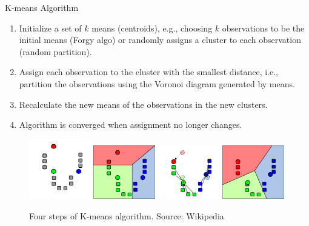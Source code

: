 \documentclass{beamer}
\begin{document}
\begin{frame}{K-means Algorithm}
    \begin{enumerate}
            \item Initialize a set of $k$ means (centroids), e.g., choosing $k$ observations to be the initial means (Forgy algo) or randomly assigns a cluster to each observation (random partition).
            \item Assign each observation to the cluster with the smallest distance, i.e., partition the observations using the Voronoi diagram generated by means.
            \item Recalculate the new means of the observations in the new clusters.
            \item Algorithm is converged when assignment no longer changes.
        \end{enumerate}
        \begin{figure}
            \includegraphics[width=0.24\textwidth]{figures/k-means-step-1.png}
            \includegraphics[width=0.24\textwidth]{figures/k-means-step-2.png}
            \includegraphics[width=0.24\textwidth]{figures/k-means-step-3.png}
            \includegraphics[width=0.24\textwidth]{figures/k-means-step-4.png}
            \caption{Four steps of K-means algorithm. Source: Wikipedia}
        \end{figure}
\end{frame} 
\end{document}

